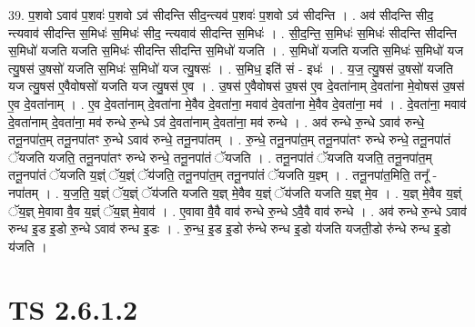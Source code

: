 \documentclass[17pt]{extarticle}
\begin{document}
39. प॒शवो ऽवाव॑ प॒शवः॑ प॒शवो ऽव॑ सीदन्ति सीद॒न्त्यव॑ प॒शवः॑ प॒शवो ऽव॑ सीदन्ति । . अव॑ सीदन्ति सीद॒ न्त्यवाव॑ सीदन्ति स॒मिधः॑ स॒मिधः॑ सीद॒ न्त्यवाव॑ सीदन्ति स॒मिधः॑ । . सी॒द॒न्ति॒ स॒मिधः॑ स॒मिधः॑ सीदन्ति सीदन्ति स॒मिधो॑ यजति यजति स॒मिधः॑ सीदन्ति सीदन्ति स॒मिधो॑ यजति । . स॒मिधो॑ यजति यजति स॒मिधः॑ स॒मिधो॑ यज त्यु॒षस॑ उ॒षसो॑ यजति स॒मिधः॑ स॒मिधो॑ यज त्यु॒षसः॑ । . स॒मिध॒ इति॑ सं - इधः॑ । . य॒ज॒ त्यु॒षस॑ उ॒षसो॑ यजति यज त्यु॒षस॑ ए॒वैवोषसो॑ यजति यज त्यु॒षस॑ ए॒व । . उ॒षस॑ ए॒वैवोषस॑ उ॒षस॑ ए॒व दे॒वता॑नाम् दे॒वता॑ना मे॒वोषस॑ उ॒षस॑ ए॒व दे॒वता॑नाम् । . ए॒व दे॒वता॑नाम् दे॒वता॑ना मे॒वैव दे॒वता॑ना॒ मवाव॑ दे॒वता॑ना मे॒वैव दे॒वता॑ना॒ मव॑ । . दे॒वता॑ना॒ मवाव॑ दे॒वता॑नाम् दे॒वता॑ना॒ मव॑ रुन्धे रु॒न्धे ऽव॑ दे॒वता॑नाम् दे॒वता॑ना॒ मव॑ रुन्धे । . अव॑ रुन्धे रु॒न्धे ऽवाव॑ रुन्धे॒ तनू॒नपा॑त॒म् तनू॒नपा॑तꣳ रु॒न्धे ऽवाव॑ रुन्धे॒ तनू॒नपा॑तम् । . रु॒न्धे॒ तनू॒नपा॑त॒म् तनू॒नपा॑तꣳ रुन्धे रुन्धे॒ तनू॒नपा॑तं ॅयजति यजति॒ तनू॒नपा॑तꣳ रुन्धे रुन्धे॒ तनू॒नपा॑तं ॅयजति । . तनू॒नपा॑तं ॅयजति यजति॒ तनू॒नपा॑त॒म् तनू॒नपा॑तं ॅयजति य॒ज्ञ्ं ॅय॒ज्ञ्ं ॅय॑जति॒ तनू॒नपा॑त॒म् तनू॒नपा॑तं ॅयजति य॒ज्ञ्म् । . तनू॒नपा॑त॒मिति॒ तनू᳚ - नपा॑तम् । . य॒ज॒ति॒ य॒ज्ञ्ं ॅय॒ज्ञ्ं ॅय॑जति यजति य॒ज्ञ् मे॒वैव य॒ज्ञ्ं ॅय॑जति यजति य॒ज्ञ् मे॒व । . य॒ज्ञ् मे॒वैव य॒ज्ञ्ं ॅय॒ज्ञ् मे॒वावा वै॒व य॒ज्ञ्ं ॅय॒ज्ञ् मे॒वाव॑ । . ए॒वावा वै॒वै वाव॑ रुन्धे रु॒न्धे ऽवै॒वै वाव॑ रुन्धे । . अव॑ रुन्धे रु॒न्धे ऽवाव॑ रुन्ध इ॒ड इ॒डो रु॒न्धे ऽवाव॑ रुन्ध इ॒डः । . रु॒न्ध॒ इ॒ड इ॒डो रु॑न्धे रुन्ध इ॒डो य॑जति यजती॒डो रु॑न्धे रुन्ध इ॒डो य॑जति । \newline
\pagebreak
{}
\section*{ TS 2.6.1.2 }
\end{document}
